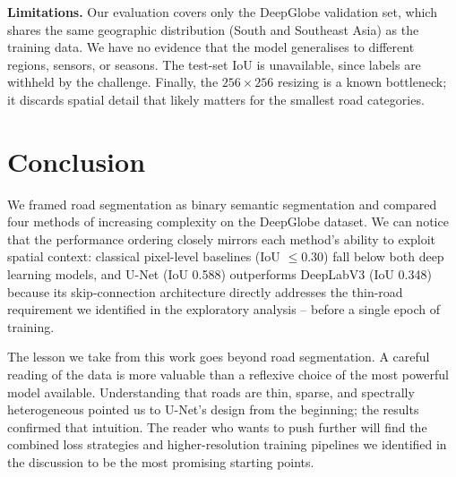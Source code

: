 \documentclass[conference]{IEEEtran}
\begin{document}
\textbf{Limitations.}
Our evaluation covers only the DeepGlobe validation set, which shares the same geographic
distribution (South and Southeast Asia) as the training data.
We have no evidence that the model generalises to different regions, sensors, or seasons.
The test-set IoU is unavailable, since labels are withheld by the challenge.
Finally, the $256 \times 256$ resizing is a known bottleneck; it discards spatial detail
that likely matters for the smallest road categories.

\section{Conclusion}
\label{sec:conclusion}

We framed road segmentation as binary semantic segmentation and compared four methods of
increasing complexity on the DeepGlobe dataset.
We can notice that the performance ordering closely mirrors each method's ability to exploit
spatial context: classical pixel-level baselines (IoU $\leq 0.30$) fall below both deep
learning models, and U-Net (IoU 0.588) outperforms DeepLabV3 (IoU 0.348) because its
skip-connection architecture directly addresses the thin-road requirement we identified in
the exploratory analysis -- before a single epoch of training.

The lesson we take from this work goes beyond road segmentation.
A careful reading of the data is more valuable than a reflexive choice of the most powerful
model available.
Understanding that roads are thin, sparse, and spectrally heterogeneous pointed us to
U-Net's design from the beginning; the results confirmed that intuition.
The reader who wants to push further will find the combined loss strategies and
higher-resolution training pipelines we identified in the discussion to be the most
promising starting points.



\end{document}
